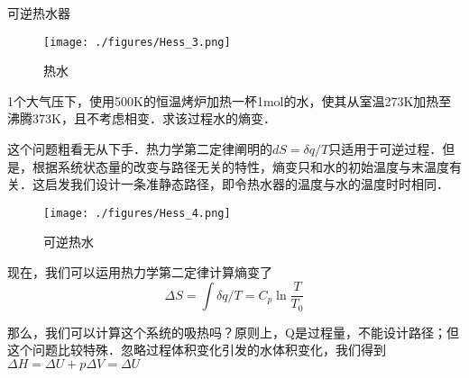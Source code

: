 \begin{example}{可逆热水器}
\begin{figure}[ht]
\centering
\texttt{[image: ./figures/Hess\_3.png]}
\caption{热水} \label{Hess_fig3}
\end{figure}
1个大气压下，使用500K的恒温烤炉加热一杯1mol的水，使其从室温273K加热至沸腾373K，且不考虑相变．求该过程水的熵变．

这个问题粗看无从下手．热力学第二定律阐明的$dS=\delta q/T$只适用于可逆过程．但是，根据系统状态量的改变与路径无关的特性，熵变只和水的初始温度与末温度有关．这启发我们设计一条准静态路径，即令热水器的温度与水的温度时时相同．

\begin{figure}[ht]
\centering
\texttt{[image: ./figures/Hess\_4.png]}
\caption{可逆热水} \label{Hess_fig4}
\end{figure}
现在，我们可以运用热力学第二定律计算熵变了 $$\Delta S=\int \delta q/T=C_p \ln \frac{T}{T_0}$$

那么，我们可以计算这个系统的吸热吗？原则上，Q是过程量，不能设计路径；但这个问题比较特殊．忽略过程体积变化引发的水体积变化，我们得到$\Delta H = \Delta U + p \Delta V= \Delta U$
\end{example}